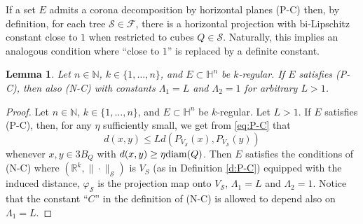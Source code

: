 \documentclass[12pt]{amsart}
\newcommand{\R}{\mathbb R}
\newcommand{\diam}{{\rm diam}}
\numberwithin{equation}{section}
\theoremstyle{plain}
\newtheorem{lemma}[theorem]{Lemma}
\theoremstyle{definition}
\theoremstyle{remark}
\begin{document}
If a set $E$ admits a corona decomposition by horizontal planes (P-C) then, by definition, for each tree $\mathcal{S}\in \mathcal{F}$, there is a horizontal projection with bi-Lipschitz constant close to $1$ when restricted to cubes $Q\in \mathcal{S}$. Naturally, this implies an analogous condition where ``close to $1$'' is replaced by a definite constant. 

\begin{lemma}\label{l:P-CtoN-C}
    Let $n\in \mathbb{N}$, $k\in \{1,\ldots,n\}$, and $E\subset \mathbb{H}^n$ be $k$-regular. If $E$ satisfies  (P-C), then also (N-C) with constants $\Lambda_1=L$ and $\Lambda_2=1$ for arbitrary $L>1$.
\end{lemma}

\begin{proof}
    Let $n\in \mathbb{N}$, $k\in \{1,\ldots,n\}$, and $E\subset \mathbb{H}^n$ be $k$-regular. Let $L>1$. If $E$ satisfies (P-C), then, for any $\eta$ sufficiently small, we get from \eqref{eq:P-C} that 
\begin{equation}\label{eq:PL-C}
d(x,y)\leq L d(P_{V_\mathcal S}(x), P_{V_\mathcal S}(y))\end{equation}
whenever $x,y\in 3B_Q$ with $d(x,y)\geq \eta\diam(Q)$. %
Then $E$ satisfies the conditions of (N-C) where $(\R^k,\|\cdot\|_\mathcal S)$ is $V_S$ (as in Definition \ref{d:P-C}) equipped with the induced distance, $\varphi_\mathcal S$ is the projection map onto $V_\mathcal S$,
$\Lambda_1=L$ and $\Lambda_2=1$. Notice that the constant ``$C$'' in the definition of (N-C) is allowed to depend also on $\Lambda_1=L$.
\end{proof}





\end{document}

